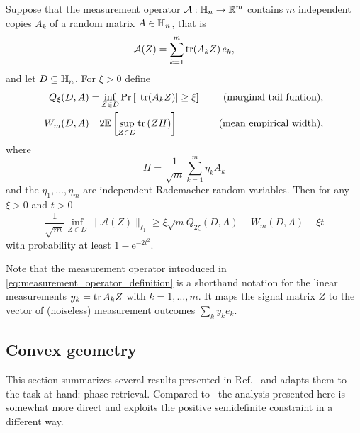 \begin{theorem} \label{thm:mendelson}
  Suppose that the measurement operator $\mathcal{A}:\mathbb{H}_n \to \mathbb{R}^m$ contains $m$ independent copies $A_k$ of a random matrix $A \in \mathbb{H}_n$, that is
  \[
    \label{eq:measurement_operator_definition}
    \mathcal{A}(Z) = \sum_{k=1}^m \operatorname{tr} (A_k Z) \,  e_k,
  \]
  and let $D \subseteq \mathbb{H}_n$.
  For $\xi >0$ define
  \begin{align}
    Q_\xi (D, A) =& \inf_{Z \in D}\mathrm{Pr} \left[ | \operatorname{tr} (A_k Z) | \geq \xi \right] \quad &\textrm{(marginal tail funtion)}, \label{eq:marginal_tail_function}\\
    W_m (D, A) =& 2 \mathbb{E} \left[ \sup_{Z \in D} \operatorname{tr} \left( Z H \right) \right] \quad &\textrm{(mean empirical width)},
  \end{align}
  where
  \[
    H= \frac{1}{\sqrt{m}} \sum_{k=1}^m \eta_k A_k
  \]
  and the $\eta_1,\ldots,\eta_m$ are independent Rademacher random variables.
  Then for any $\xi >0$ and $t >0$
  \[
    \frac{1}{\sqrt{m}}\inf_{Z \in D} \| \mathcal{A}(Z) \|_{\ell_1} \geq \xi \sqrt{m} Q_{2\xi}(D, A) -  W_m (D, A)-\xi t \label{eq:mendelson}
  \]
  with probability at least $1-\mathrm{e}^{-2t^2}$.
\end{theorem}

Note that the measurement operator introduced in \cref{eq:measurement_operator_definition} is a shorthand notation for the linear measurements $y_k = \operatorname{tr} A_k Z$ with $k=1,\ldots,m$.
It maps the signal matrix $Z$ to the vector of (noiseless) measurement outcomes $\sum_k y_k  e_k$.


\subsection{Convex geometry}

This section summarizes several results presented in Ref.~\cite{kabanava_stable_2016} and adapts them to the task at hand: phase retrieval.
Compared to~\cite{kabanava_stable_2016} the analysis presented here is somewhat more direct and exploits the positive semidefinite constraint in a different way.

